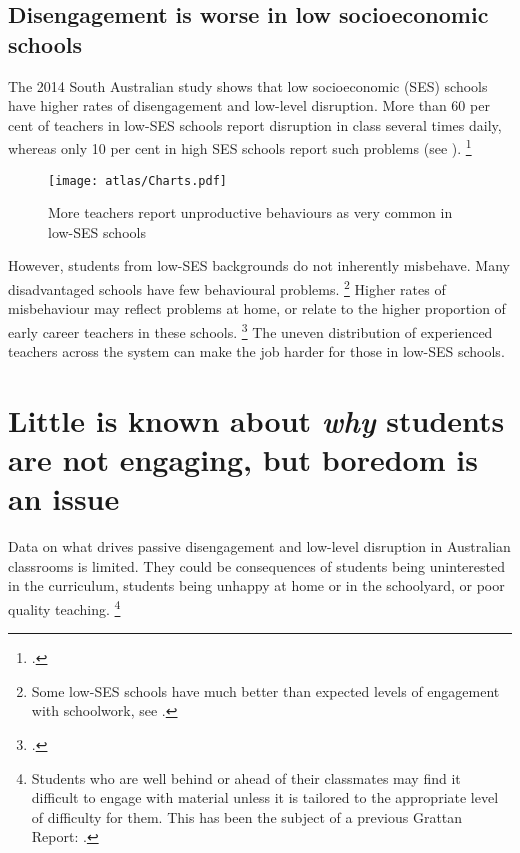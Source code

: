 \documentclass{grattan}
\begin{document}
\subsection{Disengagement is worse in low socioeconomic schools}\label{subsec:low-engagement-higher}

The 2014 South Australian study shows that low socioeconomic (SES) schools have higher rates of disengagement and low-level disruption. More than 60 per cent of teachers in low-SES schools report disruption in class several times daily, whereas only 10 per cent in high SES schools report such problems (see ).
    \footcite{Sullivan2014PunishThemEngage}

\begin{figure}
\caption{More teachers report unproductive behaviours as very common in low-SES schools\label{fig:unproductive-behaviours-low-SES}}%
\texttt{[image: atlas/Charts.pdf]}
\end{figure}

However, students from low-SES backgrounds do not inherently misbehave. Many disadvantaged schools have few behavioural problems.%
    \footnote{Some low-SES schools have much better than expected levels of engagement with schoolwork, see \textcite{Angus2009PipelineProject}.}
Higher rates of misbehaviour may reflect problems at home, or relate to the higher proportion of early career teachers in these schools.%
    \footcite{Freeman2014AustralianTeachersLearning}
The uneven distribution of experienced teachers across the system can make the job harder for those in low-SES schools.

\section{Little is known about \emph{why} students are not engaging, but boredom is an issue}\label{sec:little-known-about-why}
Data on what drives passive disengagement and low-level disruption in Australian classrooms is limited. They could be consequences of students being uninterested in the curriculum, students being unhappy at home or in the schoolyard, or poor quality teaching.%
    \footnote{Students who are well behind or ahead of their classmates may find it difficult to engage with material unless it is tailored to the appropriate level of difficulty for them.
    This has been the subject of a previous Grattan Report: \textcite{Goss2015TargetedTeachingHow}.}
\end{document}
